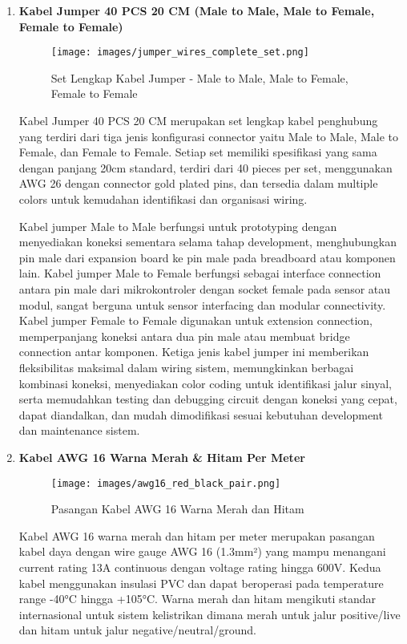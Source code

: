 \documentclass[12pt,a4paper]{article}
\begin{document}
\begin{enumerate}[leftmargin=0pt,itemsep=1em]
\item \textbf{Kabel Jumper 40 PCS 20 CM (Male to Male, Male to Female, Female to Female)}

\begin{figure}[H]
\centering
\texttt{[image: images/jumper\_wires\_complete\_set.png]}
\caption{Set Lengkap Kabel Jumper - Male to Male, Male to Female, Female to Female}
\label{fig:jumper_wires_complete}
\end{figure}

Kabel Jumper 40 PCS 20 CM merupakan set lengkap kabel penghubung yang terdiri dari tiga jenis konfigurasi connector yaitu Male to Male, Male to Female, dan Female to Female. Setiap set memiliki spesifikasi yang sama dengan panjang 20cm standard, terdiri dari 40 pieces per set, menggunakan AWG 26 dengan connector gold plated pins, dan tersedia dalam multiple colors untuk kemudahan identifikasi dan organisasi wiring.

Kabel jumper Male to Male berfungsi untuk prototyping dengan menyediakan koneksi sementara selama tahap development, menghubungkan pin male dari expansion board ke pin male pada breadboard atau komponen lain. Kabel jumper Male to Female berfungsi sebagai interface connection antara pin male dari mikrokontroler dengan socket female pada sensor atau modul, sangat berguna untuk sensor interfacing dan modular connectivity. Kabel jumper Female to Female digunakan untuk extension connection, memperpanjang koneksi antara dua pin male atau membuat bridge connection antar komponen. Ketiga jenis kabel jumper ini memberikan fleksibilitas maksimal dalam wiring sistem, memungkinkan berbagai kombinasi koneksi, menyediakan color coding untuk identifikasi jalur sinyal, serta memudahkan testing dan debugging circuit dengan koneksi yang cepat, dapat diandalkan, dan mudah dimodifikasi sesuai kebutuhan development dan maintenance sistem.

\item \textbf{Kabel AWG 16 Warna Merah \& Hitam Per Meter}

\begin{figure}[H]
\centering
\texttt{[image: images/awg16\_red\_black\_pair.png]}
\caption{Pasangan Kabel AWG 16 Warna Merah dan Hitam}
\label{fig:awg16_pair}
\end{figure}

Kabel AWG 16 warna merah dan hitam per meter merupakan pasangan kabel daya dengan wire gauge AWG 16 (1.3mm²) yang mampu menangani current rating 13A continuous dengan voltage rating hingga 600V. Kedua kabel menggunakan insulasi PVC dan dapat beroperasi pada temperature range -40°C hingga +105°C. Warna merah dan hitam mengikuti standar internasional untuk sistem kelistrikan dimana merah untuk jalur positive/live dan hitam untuk jalur negative/neutral/ground.


\end{enumerate}
\end{document}
